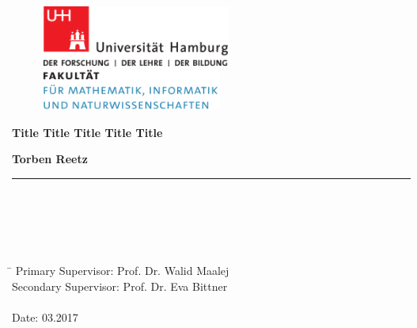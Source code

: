 \begin{titlepage}

  \setcounter{page}{-1}

	\begin{figure}[h]
		\begin{minipage}[b]{62mm}
			\includegraphics[width=62mm]{images/unilogo}
		\end{minipage}
		\hspace{4cm}
		\begin{minipage}[b]{59mm}
			\includegraphics[width=59mm]{images/minlogo}
		\end{minipage}
	\end{figure}

	\vfill

	\begin{center}
		\vspace{14mm}
		\noindent \textbf{\huge
		Title Title Title Title Title \\
		}
		\vspace{14mm}
	\end{center}

	\vfill

	\noindent \textbf{Torben Reetz} \\
	\noindent \rule{\textwidth}{0.4mm}
	 \\
	 \\
	 \\
	 \\
	\begin{tabbing}
	\hspace{8em} \=  \kill
	Primary Supervisor: Prof. Dr. Walid Maalej \\
	Secondary Supervisor: Prof. Dr. Eva Bittner \\
	~ \\
	Date: 03.2017
	\end{tabbing}


\end{titlepage}

